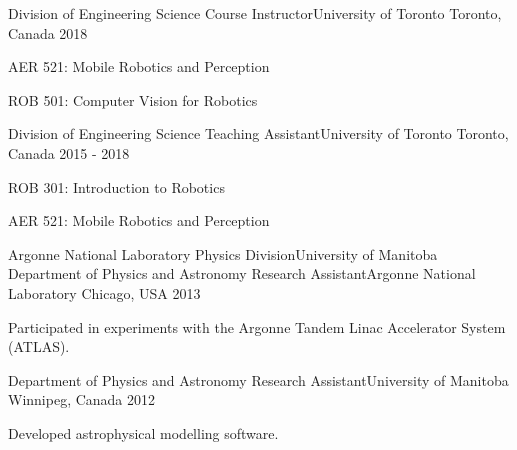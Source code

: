 \begin{cventries}
  \cventry
    {Division of Engineering Science} %
    {Course Instructor{\enskip\cdotp\enskip}University of Toronto} %
    {Toronto, Canada} %
    {2018} %
    {
      \begin{cvitems} %
        \item {AER 521: Mobile Robotics and Perception}
        \item {ROB 501: Computer Vision for Robotics}
      \end{cvitems}
    }

  \cventry
    {Division of Engineering Science} %
    {Teaching Assistant{\enskip\cdotp\enskip}University of Toronto} %
    {Toronto, Canada} %
    {2015 - 2018} %
    {
      \begin{cvitems} %
        \item {ROB 301: Introduction to Robotics}
        \item {AER 521: Mobile Robotics and Perception}
      \end{cvitems}
    }


  \cventry
    {Argonne National Laboratory Physics Division{\enskip\cdotp\enskip}University of Manitoba Department of Physics and Astronomy} %
    {Research Assistant{\enskip\cdotp\enskip}Argonne National Laboratory} %
    {Chicago, USA} %
    {2013} %
    {
      \begin{cvitems} %
        \item {Participated in experiments with the Argonne Tandem Linac Accelerator System (ATLAS).}
      \end{cvitems}
    }
  
    \cventry
    {Department of Physics and Astronomy} %
    {Research Assistant{\enskip\cdotp\enskip}University of Manitoba} %
    {Winnipeg, Canada} %
    {2012} %
    {
      \begin{cvitems} %
        \item {Developed astrophysical modelling software.}
      \end{cvitems}
    }

\end{cventries}
